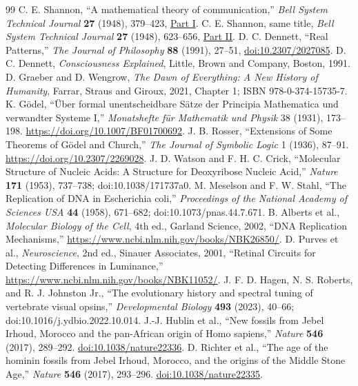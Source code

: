 \documentclass[10pt,letterpaper]{article}
\theoremstyle{definition}\newtheorem{definition}[theorem]{Definition}
\begin{document}
\begin{thebibliography}{99}
 C. E. Shannon, ``A mathematical theory of communication,'' \emph{Bell System Technical Journal} \textbf{27} (1948), 379--423, \href{https://doi.org/10.1002/j.1538-7305.1948.tb01338.x}{Part I}.
 C. E. Shannon, same title, \emph{Bell System Technical Journal} \textbf{27} (1948), 623--656, \href{https://doi.org/10.1002/j.1538-7305.1948.tb00917.x}{Part II}.
 D. C. Dennett, ``Real Patterns,'' \emph{The Journal of Philosophy} \textbf{88} (1991), 27--51, \href{https://doi.org/10.2307/2027085}{doi:10.2307/2027085}.
 D. C. Dennett, \emph{Consciousness Explained}, Little, Brown and Company, Boston, 1991.
 D. Graeber and D. Wengrow, \emph{The Dawn of Everything: A New History of Humanity}, Farrar, Straus and Giroux, 2021, Chapter 1; ISBN 978-0-374-15735-7.
 K. G\"odel, ``\"Uber formal unentscheidbare S\"atze der Principia Mathematica und verwandter Systeme I,'' \emph{Monatshefte f\"ur Mathematik und Physik} 38 (1931), 173--198. \url{https://doi.org/10.1007/BF01700692}.
 J. B. Rosser, ``Extensions of Some Theorems of G\"odel and Church,'' \emph{The Journal of Symbolic Logic} 1 (1936), 87--91. \url{https://doi.org/10.2307/2269028}.
 J. D. Watson and F. H. C. Crick, ``Molecular Structure of Nucleic Acids: A Structure for Deoxyribose Nucleic Acid,'' \emph{Nature} \textbf{171} (1953), 737--738; doi:10.1038/171737a0.
 M. Meselson and F. W. Stahl, ``The Replication of DNA in Escherichia coli,'' \emph{Proceedings of the National Academy of Sciences USA} \textbf{44} (1958), 671--682; doi:10.1073/pnas.44.7.671.
 B. Alberts et al., \emph{Molecular Biology of the Cell}, 4th ed., Garland Science, 2002, ``DNA Replication Mechanisms,'' \url{https://www.ncbi.nlm.nih.gov/books/NBK26850/}.
 D. Purves et al., \emph{Neuroscience}, 2nd ed., Sinauer Associates, 2001, ``Retinal Circuits for Detecting Differences in Luminance,'' \url{https://www.ncbi.nlm.nih.gov/books/NBK11052/}.
 J. F. D. Hagen, N. S. Roberts, and R. J. Johnston Jr., ``The evolutionary history and spectral tuning of vertebrate visual opsins,'' \emph{Developmental Biology} \textbf{493} (2023), 40--66; doi:10.1016/j.ydbio.2022.10.014.
 J.-J. Hublin et al., ``New fossils from Jebel Irhoud, Morocco and the pan-African origin of Homo sapiens,'' \emph{Nature} \textbf{546} (2017), 289--292. \href{https://doi.org/10.1038/nature22336}{doi:10.1038/nature22336}.
 D. Richter et al., ``The age of the hominin fossils from Jebel Irhoud, Morocco, and the origins of the Middle Stone Age,'' \emph{Nature} \textbf{546} (2017), 293--296. \href{https://doi.org/10.1038/nature22335}{doi:10.1038/nature22335}.
\end{thebibliography}
\endgroup
\end{document}
